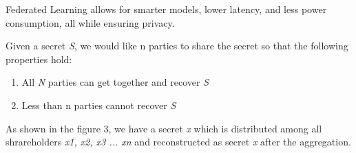 \documentclass[conference]{IEEEtran}
\begin{document}
Federated Learning allows for smarter models, lower latency, and less power consumption, all while ensuring privacy. 

Given a secret {\itshape S}, we would like n parties to share the secret so that the following properties hold:

\begin{enumerate} 
 \setlength{\itemsep}{-2ex}  
 \setlength{\parskip}{0ex} 
 \setlength{\parsep}{0ex}
\item All {\itshape N} parties can get together and recover {\itshape S} \hfil\break
\item Less than n parties cannot recover {\itshape S} \hfil\break
\end{enumerate}

As shown in the figure 3, we have a secret {\itshape x} which is distributed among all shrareholders {\itshape x1, x2, x3 ... xn} and reconstructed as secret {\itshape x} after the aggregation.
\end{document}
